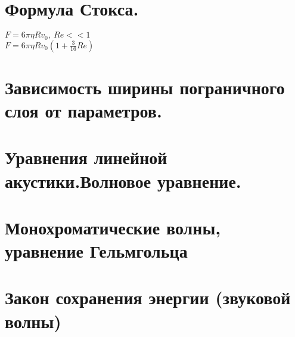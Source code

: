 \begin{multicols*}{4}
		\section{Формула Стокса.}
		$F=6\pi\eta Rv_0,~Re << 1$ \\
		$F=6\pi\eta Rv_0\left(1+\frac{3}{16}Re\right)$
		
		\section{Зависимость ширины пограничного слоя от параметров.}
		\section{Уравнения линейной акустики.Волновое уравнение.}
		\section{Монохроматические волны, уравнение Гельмгольца}
		\section{Закон сохранения энергии (звуковой волны)}
	\end{multicols*}
